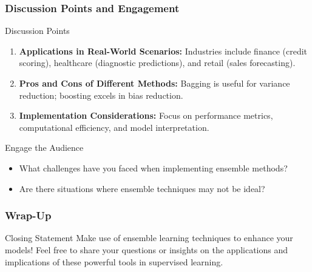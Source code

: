 \documentclass[aspectratio=169]{beamer}
\begin{document}
\begin{frame}[fragile]
    \frametitle{Discussion Points and Engagement}
    \begin{block}{Discussion Points}
        \begin{enumerate}
            \item \textbf{Applications in Real-World Scenarios:} 
            Industries include finance (credit scoring), healthcare (diagnostic predictions), and retail (sales forecasting).
            \item \textbf{Pros and Cons of Different Methods:}
            Bagging is useful for variance reduction; boosting excels in bias reduction.
            \item \textbf{Implementation Considerations:}
            Focus on performance metrics, computational efficiency, and model interpretation.
        \end{enumerate}
    \end{block}

    \begin{block}{Engage the Audience}
        \begin{itemize}
            \item What challenges have you faced when implementing ensemble methods?
            \item Are there situations where ensemble techniques may not be ideal?
        \end{itemize}
    \end{block}
\end{frame}

\begin{frame}[fragile]
    \frametitle{Wrap-Up}
    \begin{block}{Closing Statement}
        Make use of ensemble learning techniques to enhance your models! Feel free to share your questions or insights on the applications and implications of these powerful tools in supervised learning.
    \end{block}
\end{frame}
\end{document}
